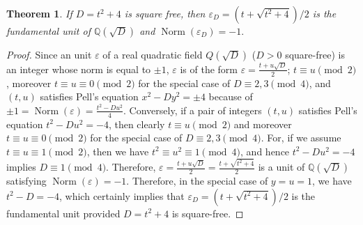 \documentclass[12pt]{amsart}
\theoremstyle{plain}
\newtheorem{thm}{Theorem}
\theoremstyle{definition}
\theoremstyle{remark}
\numberwithin{equation}{section}
\numberwithin{thm}{section}
\theoremstyle{named}
\theoremstyle{named}
\begin{document}
\begin{thm}
    If $D = t^2 + 4$ is square free, then $\varepsilon_{D} = (t + \sqrt{t^2 + 4})/2$ is the fundamental unit of $\mathbb{Q}(\sqrt{D}) $ and $\operatorname{Norm}(\varepsilon_{D}) = -1.$
\end{thm}
\begin{proof}

Since an unit $\varepsilon$ of a real quadratic field $Q(\sqrt{D})$ ($D > 0$ square-free) is an integer whose norm is equal to $\pm 1$, $\varepsilon$ is of the form $\varepsilon = \frac{t + u \sqrt{D}}{2}$; $t \equiv u \pmod{2}$, moreover $t \equiv u \equiv 0 \pmod{2}$ for the special case of $D \equiv 2, 3 \pmod{4}$, and $(t, u)$ satisfies Pell's equation $x^2 - Dy^2 = \pm 4$ because of $\pm 1 = \operatorname{Norm}(\varepsilon) = \frac{t^2 - Du^2}{4}$.
Conversely, if a pair of integers $(t, u)$ satisfies Pell's equation $t^2 - Du^2 = -4$, then clearly $t \equiv u \pmod{2}$ and moreover $t \equiv u \equiv 0 \pmod{2}$ for the special case of $D \equiv 2, 3 \pmod{4}$. For, if we assume $t \equiv u \equiv 1 \pmod{2}$, then we have $t^2 \equiv u^2 \equiv 1 \pmod{4}$, and hence $t^2 - Du^2 = -4$ implies $D \equiv 1 \pmod{4}$. Therefore, $\varepsilon = \frac{t + u \sqrt{D}}{2} = \frac{t + \sqrt{t^2 + 4}}{2}$ is a unit of $\mathbb{Q}(\sqrt{D})$ satisfying $\operatorname{Norm}(\varepsilon) = -1$. Therefore, in the special case of $y = u = 1$, we have $t^2 - D = -4$, which certainly implies that $\varepsilon_D = (t + \sqrt{t^2 + 4})/2$ is the fundamental unit provided $D = t^2 + 4$ is square-free.
\end{proof}
\end{document}

